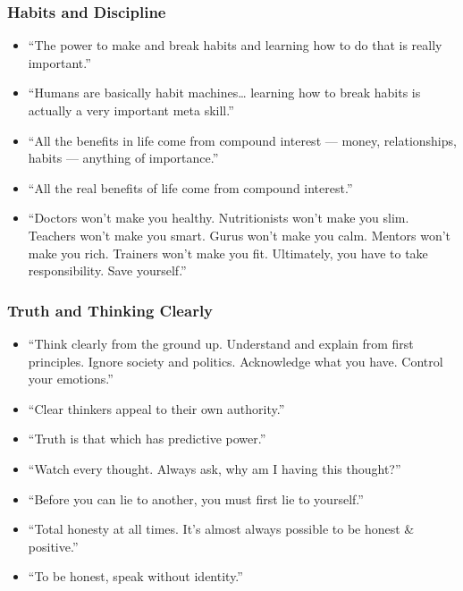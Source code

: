 \begin{frame}[fragile]\frametitle{Habits and Discipline}
      \begin{itemize}
        \item “The power to make and break habits and learning how to do that is really important.”
        \item “Humans are basically habit machines… learning how to break habits is actually a very important meta skill.”
        \item “All the benefits in life come from compound interest — money, relationships, habits — anything of importance.”
        \item “All the real benefits of life come from compound interest.”
        \item “Doctors won’t make you healthy. Nutritionists won’t make you slim. Teachers won’t make you smart. Gurus won’t make you calm. Mentors won’t make you rich. Trainers won’t make you fit. Ultimately, you have to take responsibility. Save yourself.”
      \end{itemize}
\end{frame}
\begin{frame}[fragile]\frametitle{Truth and Thinking Clearly}
      \begin{itemize}
        \item “Think clearly from the ground up. Understand and explain from first principles. Ignore society and politics. Acknowledge what you have. Control your emotions.”
        \item “Clear thinkers appeal to their own authority.”
        \item “Truth is that which has predictive power.”
        \item “Watch every thought. Always ask, why am I having this thought?”
        \item “Before you can lie to another, you must first lie to yourself.”
        \item “Total honesty at all times. It’s almost always possible to be honest & positive.”
        \item “To be honest, speak without identity.”
      \end{itemize}
\end{frame}

